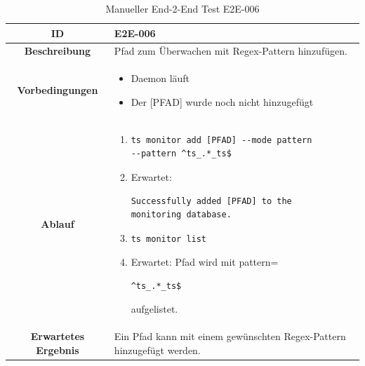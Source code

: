 \documentclass[a4paper,12pt]{report}
\begin{document}
    \begin{table}[h!]
        \centering
        \setlength{\leftmargini}{0.8cm}
        \begin{tabular}{|c|p{10cm}|}
            \hline
            \textbf{ID}                  & E2E-006                                                               \\ \hline
            \textbf{Beschreibung}        & Pfad zum Überwachen mit Regex-Pattern hinzufügen.                     \\ \hline
            \textbf{Vorbedingungen} &
            \begin{itemize}
                \item Daemon läuft
                \item  Der [PFAD] wurde noch nicht hinzugefügt
            \end{itemize} \\ \hline
            \textbf{Ablauf} &
            \begin{enumerate}
                \item \begin{verbatim}ts monitor add [PFAD] --mode pattern
--pattern ^ts_.*_ts$
                \end{verbatim}
                \item Erwartet: \begin{verbatim}Successfully added [PFAD] to the
monitoring database.
                \end{verbatim}
                \item \begin{verbatim}ts monitor list
                \end{verbatim}
                \item Erwartet: Pfad wird mit pattern=\begin{verbatim}^ts_.*_ts$
                \end{verbatim} aufgelistet.
            \end{enumerate} \\ \hline
            \textbf{Erwartetes Ergebnis} & Ein Pfad kann mit einem gewünschten Regex-Pattern hinzugefügt werden. \\ \hline
        \end{tabular}
        \caption{Manueller End-2-End Test E2E-006}\label{tab:e2e-6}
    \end{table}

    \clearpage
\end{document}
